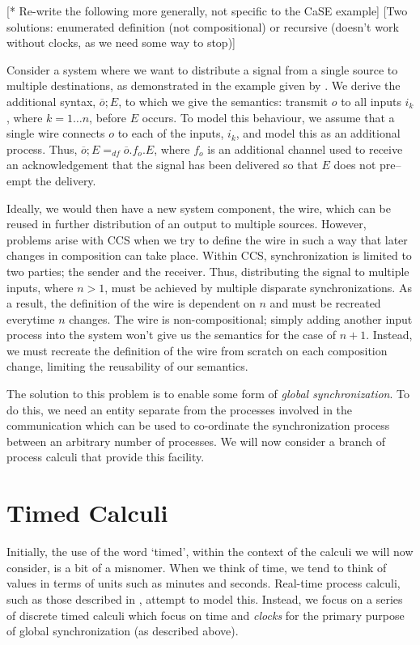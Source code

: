 [* Re-write the following more generally, not specific to the CaSE example]
[Two solutions: enumerated definition (not compositional) or recursive
(doesn't work without clocks, as we need some way to stop)]

Consider a system where we want to distribute a signal from a single
source to multiple destinations, as demonstrated in the example given by
\cite{CaSE}.  We derive the additional syntax, $\overline{o};E$, to
which we give the semantics: transmit $o$ to all inputs $i_k$, where $k
= 1\dots n$, before $E$ occurs.  To model this behaviour, we assume that
a single wire connects $o$ to each of the inputs, $i_k$, and model this
as an additional process.  Thus, $\overline{o};E =_{df}
\overline{o}.f_o.E$, where $f_o$ is an additional channel used to
receive an acknowledgement that the signal has been delivered so that
$E$ does not pre--empt the delivery.

Ideally, we would then have a new system component, the wire, which can
be reused in further distribution of an output to multiple sources.
However, problems arise with CCS when we try to define the wire in such
a way that later changes in composition can take place.  Within CCS,
synchronization is limited to two parties; the sender and the receiver.
Thus, distributing the signal to multiple inputs, where $n > 1$, must be
achieved by multiple disparate synchronizations.  As a result, the
definition of the wire is dependent on $n$ and must be recreated
everytime $n$ changes.  The wire is non-compositional; simply adding
another input process into the system won't give us the semantics for
the case of $n + 1$.  Instead, we must recreate the definition of the
wire from scratch on each composition change, limiting the reusability
of our semantics.

The solution to this problem is to enable some form of \emph{global
synchronization}.  To do this, we need an entity separate from the
processes involved in the communication which can be used to co-ordinate
the synchronization process between an arbitrary number of processes.
We will now consider a branch of process calculi that provide this
facility.

\section{Timed Calculi}
\label{timing}

Initially, the use of the word `timed', within the context of the
calculi we will now consider, is a bit of a misnomer.  When we think of
time, we tend to think of values in terms of units such as minutes and
seconds.  Real-time process calculi, such as those described in
\cite{tccs, satoh:phd, satoh:distrib, lee:realtime, aceto:timing,
beaten:timing, brics:lee}, attempt
to model this.  Instead, we focus on a series of discrete timed calculi
which focus on time and \emph{clocks} for the primary purpose of global
synchronization (as described above).

